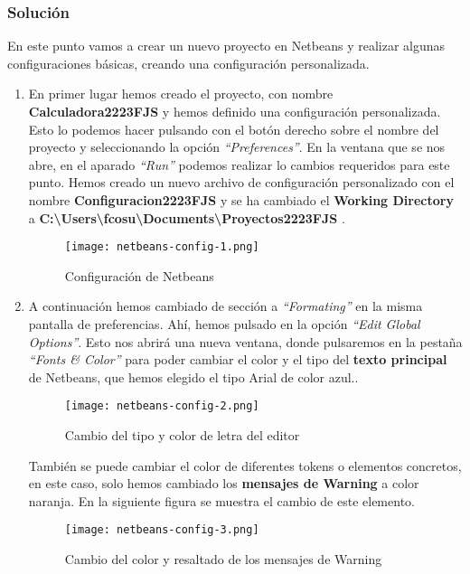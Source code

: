 \subsubsection{Solución}
En este punto vamos a crear un nuevo proyecto en Netbeans y realizar algunas configuraciones básicas, creando una configuración personalizada.

\begin{enumerate}[label=(\alph*)]
    \item En primer lugar hemos creado el proyecto, con nombre \textbf{Calculadora2223FJS} y hemos definido una configuración personalizada. Esto lo podemos hacer pulsando con el botón derecho sobre el nombre del proyecto y seleccionando la opción \textit{``Preferences''}. En la ventana que se nos abre, en el aparado \textit{``Run''} podemos realizar lo cambios requeridos para este punto. Hemos creado un nuevo archivo de configuración personalizado con el nombre \textbf{Configuracion2223FJS} y se ha cambiado el \textbf{Working Directory} a \textbf{C:\textbackslash Users\textbackslash fcosu\textbackslash Documents\textbackslash Proyectos2223FJS }.

    \begin{figure}[ht]
        \centering
        \texttt{[image: netbeans-config-1.png]}
        \caption{Configuración de Netbeans}
    \end{figure}

    \item A continuación hemos cambiado de sección a \textit{``Formating''} en la misma pantalla de preferencias. Ahí, hemos pulsado en la opción \textit{``Edit Global Options''}. Esto nos abrirá una nueva ventana, donde pulsaremos en la pestaña \textit{``Fonts \& Color''} para poder cambiar el color y el tipo del \textbf{texto principal} de Netbeans, que hemos elegido el tipo Arial de color azul..

     \begin{figure}[ht]
        \centering
        \texttt{[image: netbeans-config-2.png]}
        \caption{Cambio del tipo y color de letra del editor}
    \end{figure}

     También se puede cambiar el color de diferentes tokens o elementos concretos, en este caso, solo hemos cambiado los \textbf{mensajes de Warning} a color naranja. En la siguiente figura se muestra el cambio de este elemento.

   \begin{figure}[ht]
       \centering
       \texttt{[image: netbeans-config-3.png]}
       \caption{Cambio del color y resaltado de los mensajes de Warning}
    \end{figure}
\end{enumerate}

